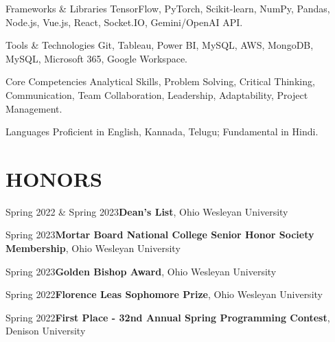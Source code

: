 \begin{skillcategory}{Frameworks \& Libraries}
    TensorFlow, PyTorch, Scikit-learn, NumPy, Pandas, Node.js, Vue.js, React, Socket.IO, Gemini/OpenAI API.
\end{skillcategory}

\begin{skillcategory}{Tools \& Technologies}
    Git, Tableau, Power BI, MySQL, AWS, MongoDB, MySQL, Microsoft 365, Google Workspace.
\end{skillcategory}

\begin{skillcategory}{Core Competencies}
    Analytical Skills, Problem Solving, Critical Thinking, Communication, Team Collaboration, Leadership, Adaptability, Project Management.
\end{skillcategory}

\begin{skillcategory}{Languages}
    Proficient in English, Kannada, Telugu; Fundamental in Hindi.
\end{skillcategory}

\vspace{\headerSpacing}
\section{HONORS}

\begin{honorentry}{Spring 2022 \& Spring 2023}{\textbf{Dean's List}, Ohio Wesleyan University}
\end{honorentry}

\begin{honorentry}{Spring 2023}{\textbf{Mortar Board National College Senior Honor Society Membership}, Ohio Wesleyan University}
\end{honorentry}

\begin{honorentry}{Spring 2023}{\textbf{Golden Bishop Award}, Ohio Wesleyan University}
\end{honorentry}

\begin{honorentry}{Spring 2022}{\textbf{Florence Leas Sophomore Prize}, Ohio Wesleyan University}
\end{honorentry}

\begin{honorentry}{Spring 2022}{\textbf{First Place - 32nd Annual Spring Programming Contest}, Denison University}
\end{honorentry}

